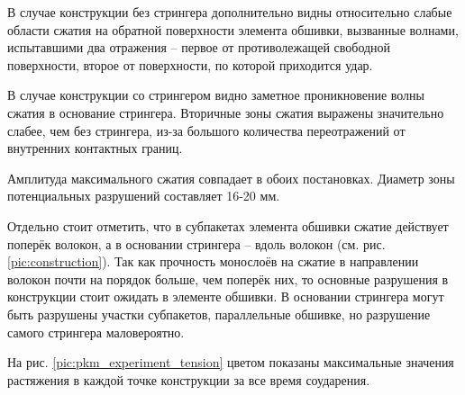 В случае конструкции без стрингера дополнительно видны относительно слабые области сжатия на обратной поверхности элемента обшивки, вызванные волнами, испытавшими два отражения -- первое от противолежащей свободной поверхности, второе от поверхности, по которой приходится удар.

В случае конструкции со стрингером видно заметное проникновение волны сжатия в основание стрингера. Вторичные зоны сжатия выражены значительно слабее, чем без стрингера, из-за большого количества переотражений от внутренних контактных границ.

Амплитуда максимального сжатия совпадает в обоих постановках. Диаметр зоны потенциальных разрушений составляет 16-20 мм.

Отдельно стоит отметить, что в субпакетах элемента обшивки сжатие действует поперёк волокон, а в основании стрингера -- вдоль волокон (см. рис. \ref{pic:construction}). Так как прочность монослоёв на сжатие в направлении волокон почти на порядок больше, чем поперёк них, то основные разрушения в конструкции стоит ожидать в элементе обшивки. В основании стрингера могут быть разрушены участки субпакетов, параллельные обшивке, но разрушение самого стрингера маловероятно.



На рис. \ref{pic:pkm_experiment_tension} цветом показаны максимальные значения растяжения в каждой точке конструкции за все время соударения.


